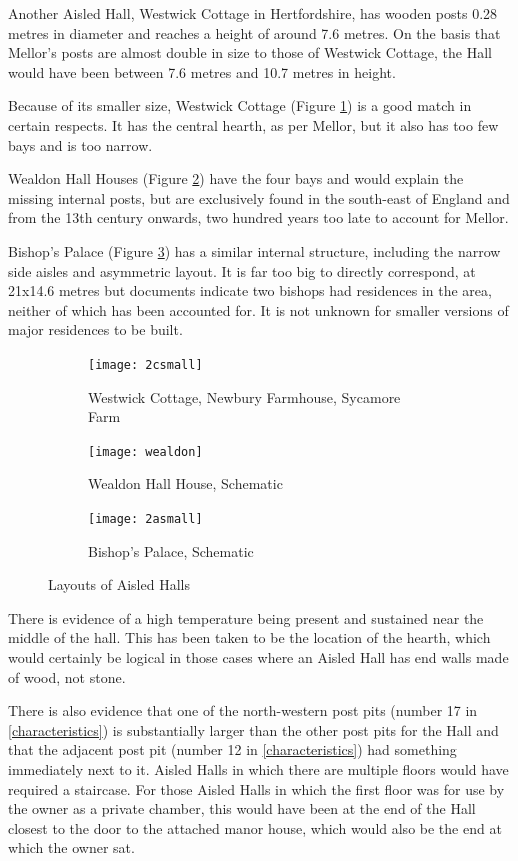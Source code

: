 \documentclass[letterpaper,11pt,titlepage]{article}
\begin{document}
{Another Aisled Hall, Westwick Cottage in Hertfordshire, has wooden posts 0.28 metres in diameter and reaches a height of around 7.6 metres. On the basis that Mellor's posts are almost double in size to those of Westwick Cottage, the Hall would have been between 7.6 metres and 10.7 metres in height.

Because of its smaller size, Westwick Cottage (Figure \ref{fig:westwick}) is a good match in certain respects. It has the central hearth, as per Mellor, but it also has too few bays and is too narrow.

Wealdon Hall Houses (Figure \ref{fig:wealdon}) have the four bays and would explain the missing internal posts, but are exclusively found in the south-east of England and from the 13th century onwards, two hundred years too late to account for Mellor.

Bishop's Palace (Figure \ref{fig:palace}) has a similar internal structure, including the narrow side aisles and asymmetric layout. It is far too big to directly correspond, at 21x14.6 metres but documents indicate two bishops had residences in the area, neither of which has been accounted for. It is not unknown for smaller versions of major residences to be built.

\begin{figure}
	\centering
	\begin{subfigure}[b]{0.45\textwidth}
		\texttt{[image: 2csmall]}
		\caption{Westwick Cottage, Newbury Farmhouse, Sycamore Farm}
		\label{fig:westwick}
	\end{subfigure}
	\begin{subfigure}[b]{0.45\textwidth}
		\texttt{[image: wealdon]}
		\caption{Wealdon Hall House, Schematic}
		\label{fig:wealdon}
	\end{subfigure}
	\begin{subfigure}[b]{0.55\textwidth}
		\texttt{[image: 2asmall]}
		\caption{Bishop's Palace, Schematic}
		\label{fig:palace}
	\end{subfigure}
	\caption{Layouts of Aisled Halls}\label{fig:layouts}
\end{figure}

There is evidence of a high temperature being present and sustained near the middle of the hall. This has been taken to be the location of the hearth, which would certainly be logical in those cases where an Aisled Hall has end walls made of wood, not stone.

There is also evidence that one of the north-western post pits (number 17 in \ref{characteristics}) is substantially larger than the other post pits for the Hall and that the adjacent post pit (number 12 in \ref{characteristics}) had something immediately next to it. Aisled Halls in which there are multiple floors would have required a staircase. For those Aisled Halls in which the first floor was for use by the owner as a private chamber, this would have been at the end of the Hall closest to the door to the attached manor house, which would also be the end at which the owner sat.

}
\end{document}

